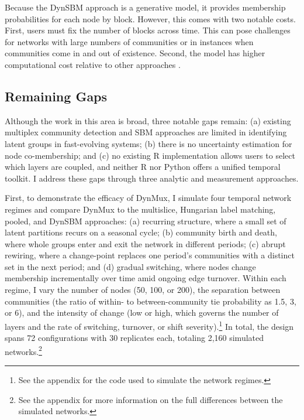 \documentclass[11pt, letterpaper]{article}
\begin{document}
Because the DynSBM approach is a generative model, it provides membership probabilities for each node by block. However, this comes with two notable costs. First, users must fix the number of blocks across time. This can pose challenges for networks with large numbers of communities or in instances when communities come in and out of existence. Second, the model has higher computational cost relative to other approaches \citep{matias2017statistical}.

\subsection{Remaining Gaps}
Although the work in this area is broad, three notable gaps remain: (a) existing multiplex community detection and SBM approaches are limited in identifying latent groups in fast-evolving systems; (b) there is no uncertainty estimation for node co-membership; and (c) no existing R implementation allows users to select which layers are coupled, and neither R nor Python offers a unified temporal toolkit. I address these gaps through three analytic and measurement approaches.


First, to demonstrate the efficacy of DynMux, I simulate four temporal network regimes and compare DynMux to the multislice, Hungarian label matching, pooled, and DynSBM approaches: (a) recurring structure, where a small set of latent partitions recurs on a seasonal cycle; (b) community birth and death, where whole groups enter and exit the network in different periods; (c) abrupt rewiring, where a change-point replaces one period's communities with a distinct set in the next period; and (d) gradual switching, where nodes change membership incrementally over time amid ongoing edge turnover. Within each regime, I vary the number of nodes (50, 100, or 200), the separation between communities (the ratio of within- to between-community tie probability as 1.5, 3, or 6), and the intensity of change (low or high, which governs the number of layers and the rate of switching, turnover, or shift severity).\footnote{See the appendix for the code used to simulate the network regimes.} In total, the design spans 72 configurations with 30 replicates each, totaling 2,160 simulated networks.\footnote{See the appendix for more information on the full differences between the simulated networks.}
\end{document}
